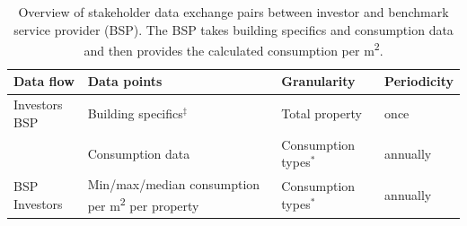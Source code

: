 \begin{table}
\caption{Overview of stakeholder data exchange pairs between investor and benchmark service provider (BSP).
The BSP takes building specifics and consumption data and then provides the calculated consumption per m\textsuperscript{2}.
}
\label{tbl:invroom}
\begin{tabular}{p{2.6cm} p{5cm} p{4cm} p{2.5cm}}
\textbf{Data flow} & \textbf{Data points} & \textbf{Granularity} & \textbf{Periodicity} \\
\hline
Investors \textrightarrow{} BSP
& Building specifics$^\ddagger$
& Total property 
& once \\

& Consumption data 
& Consumption types$^*$ 
& annually \\

BSP \textrightarrow{} Investors


& Min/max/median consumption per m\textsuperscript{2} per property 
& Consumption types$^*$ 
& annually \\
\hline
\end{tabular}
\smallskip
{}
\end{table}
\endgroup


